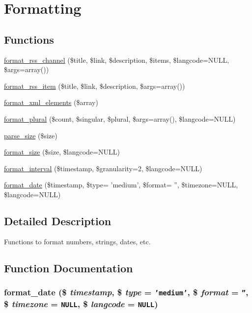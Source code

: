 \hypertarget{group__format}{
\section{Formatting}
\label{group__format}
}
\subsection*{Functions}
\begin{CompactItemize}
\item 
\hyperlink{group__format_g44992b971aed4a6a5b8457678f57de50}{format\_\-rss\_\-channel} (\$title, \$link, \$description, \$items, \$langcode=NULL, \$args=array())
\item 
\hyperlink{group__format_g4ecc9b876a9eaa65abb24ef513b217ad}{format\_\-rss\_\-item} (\$title, \$link, \$description, \$args=array())
\item 
\hyperlink{group__format_gfb344c648e6b63c35950d2889430e4c7}{format\_\-xml\_\-elements} (\$array)
\item 
\hyperlink{group__format_g0acb4fb7ab13d4b5ca3267a253af2f74}{format\_\-plural} (\$count, \$singular, \$plural, \$args=array(), \$langcode=NULL)
\item 
\hyperlink{group__format_g08382023ada29bae2a6a94f22196b066}{parse\_\-size} (\$size)
\item 
\hyperlink{group__format_g2a0075e7646fa2f399286272faa2956e}{format\_\-size} (\$size, \$langcode=NULL)
\item 
\hyperlink{group__format_g583fbfbb3172036bef0b15bfa525679a}{format\_\-interval} (\$timestamp, \$granularity=2, \$langcode=NULL)
\item 
\hyperlink{group__format_g40553742a67f9c79c4669b9053fe202c}{format\_\-date} (\$timestamp, \$type= 'medium', \$format= '', \$timezone=NULL, \$langcode=NULL)
\end{CompactItemize}


\subsection{Detailed Description}
Functions to format numbers, strings, dates, etc. 

\subsection{Function Documentation}
\hypertarget{group__format_g40553742a67f9c79c4669b9053fe202c}{
\subsubsection[{format\_\-date}]{\setlength{\rightskip}{0pt plus 5cm}format\_\-date (\$ {\em timestamp}, \/  \$ {\em type} = {\tt 'medium'}, \/  \$ {\em format} = {\tt ''}, \/  \$ {\em timezone} = {\tt NULL}, \/  \$ {\em langcode} = {\tt NULL})}}
\label{group__format_g40553742a67f9c79c4669b9053fe202c}


